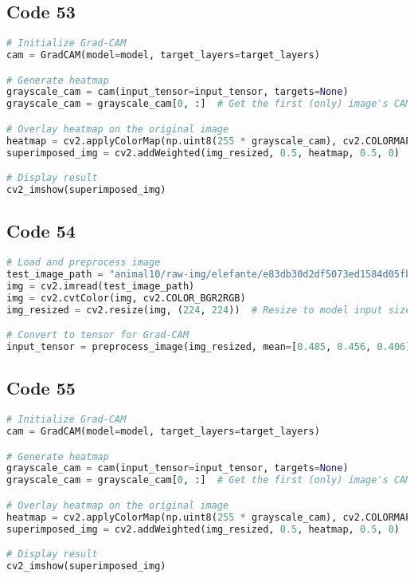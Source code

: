 \documentclass{article}
\begin{document}
\subsection*{Code 53}
\begin{lstlisting}[language=Python]
# Initialize Grad-CAM
cam = GradCAM(model=model, target_layers=target_layers)

# Generate heatmap
grayscale_cam = cam(input_tensor=input_tensor, targets=None)
grayscale_cam = grayscale_cam[0, :]  # Get the first (only) image's CAM

# Overlay heatmap on the original image
heatmap = cv2.applyColorMap(np.uint8(255 * grayscale_cam), cv2.COLORMAP_JET)
superimposed_img = cv2.addWeighted(img_resized, 0.5, heatmap, 0.5, 0)

# Display result
cv2_imshow(superimposed_img)
\end{lstlisting}

\subsection*{Code 54}
\begin{lstlisting}[language=Python]
# Load and preprocess image
test_image_path = "animal10/raw-img/elefante/e83db30d2df5073ed1584d05fb1d4e9fe777ead218ac104497f5c978a4efbcb0_640.jpg"  # Change path to an actual image
img = cv2.imread(test_image_path)
img = cv2.cvtColor(img, cv2.COLOR_BGR2RGB)
img_resized = cv2.resize(img, (224, 224))  # Resize to model input size

# Convert to tensor for Grad-CAM
input_tensor = preprocess_image(img_resized, mean=[0.485, 0.456, 0.406], std=[0.229, 0.224, 0.225])
\end{lstlisting}

\subsection*{Code 55}
\begin{lstlisting}[language=Python]
# Initialize Grad-CAM
cam = GradCAM(model=model, target_layers=target_layers)

# Generate heatmap
grayscale_cam = cam(input_tensor=input_tensor, targets=None)
grayscale_cam = grayscale_cam[0, :]  # Get the first (only) image's CAM

# Overlay heatmap on the original image
heatmap = cv2.applyColorMap(np.uint8(255 * grayscale_cam), cv2.COLORMAP_JET)
superimposed_img = cv2.addWeighted(img_resized, 0.5, heatmap, 0.5, 0)

# Display result
cv2_imshow(superimposed_img)
\end{lstlisting}
\end{document}
